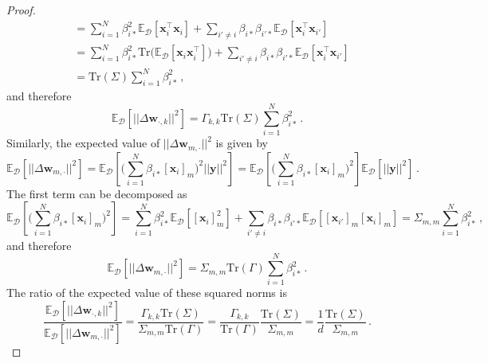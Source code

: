 \begin{proof}
\begin{equation}
\begin{split}
&=  \sum_{i=1}^N\beta^2_{i*}\mathbb{E}_{\mathcal{D}}\left[\bm{x}^\top_{i}\bm{x}_{i}\right] +
\sum_{i'\neq i}\beta_{i*}\beta_{i'*}\mathbb{E}_{\mathcal{D}}\left[\bm{x}^\top_{i}\bm{x}_{i'}\right]
\\
& =
 \sum_{i=1}^N\beta^2_{i*}\text{Tr}\big(\mathbb{E}_{\mathcal{D}}\left[\bm{x}_{i}\bm{x}_{i}^\top\right]\big) +
\sum_{i'\neq i}\beta_{i*}\beta_{i'*}\mathbb{E}_{\mathcal{D}}\left[\bm{x}^\top_{i}\bm{x}_{i'}\right] 
\\
& = \text{Tr}(\Sigma) \sum_{i=1}^N\beta^2_{i*} \,,
\end{split}
\end{equation}
%
and therefore
%
\begin{equation}
    \mathbb{E}_{\mathcal{D}}\left[ ||\Delta \bm{w}_{\cdot, k}||^2 \right] = \Gamma_{k,k}\text{Tr} (\Sigma) \sum_{i=1}^N\beta^2_{i*} \,.
\end{equation}
%
Similarly, the expected value of $||\Delta \bm{w}_{m, \cdot}||^2$ is given by
%
\begin{equation}
\mathbb{E}_{\mathcal{D}}\left[ ||\Delta \bm{w}_{m, \cdot}||^2 \right] 
= 
\mathbb{E}_{\mathcal{D}}\left[\big(\sum_{i=1}^N\beta_{i*}[\bm{x}_i]_m\big)^2 ||  \bm{y}||^2
\right]
= 
\mathbb{E}_{\mathcal{D}}\left[ \big(\sum_{i=1}^N\beta_{i*}[\bm{x}_i]_m\big)^2 \right] \mathbb{E}_{\mathcal{D}}\left[ ||  \bm{y}||^2\right]\,.
\end{equation}
%
The first term can be decomposed as
%
\begin{equation}
\mathbb{E}_{\mathcal{D}}\left[ \big(\sum_{i=1}^N\beta_{i*}[\bm{x}_i]_m\big)^2 \right]  =
\sum_{i=1}^N \beta^2_{i*}\mathbb{E}_{\mathcal{D}}\left[[\bm{x}_i]_m^2 \right]  + \sum_{i' \neq i}\beta_{i*}\beta_{i'*}\mathbb{E}_{\mathcal{D}}\left[ [\bm{x}_{i'}]_m [\bm{x}_{i}]_m \right] =  \Sigma_{m,m}\sum_{i=1}^N\beta^2_{i*} \,,
\end{equation}
%
and therefore
%
\begin{equation}
\mathbb{E}_{\mathcal{D}}\left[ ||\Delta \bm{w}_{m, \cdot}||^2 \right] = \Sigma_{m,m}\text{Tr}(\Gamma) \sum_{i=1}^N\beta^2_{i*}\,.
\end{equation}
%
The ratio of the expected value of these squared norms is
%
\begin{equation}
\frac{\mathbb{E}_{\mathcal{D}}\left[ ||\Delta \bm{w}_{\cdot, k}||^2 \right]}{\mathbb{E}_{\mathcal{D}}\left[ ||\Delta \bm{w}_{m, \cdot}||^2 \right]} = \frac{ \Gamma_{k,k}\text{Tr}(\Sigma)}{ \Sigma_{m,m}\text{Tr}(\Gamma)} = \frac{\Gamma_{k,k}}{\text{Tr}(\Gamma)}\frac{\text{Tr}(\Sigma)}{\Sigma_{m,m}} = \frac{1}{d}\frac{\text{Tr}(\Sigma)}{\Sigma_{m,m}} \,.

\end{equation}
\end{proof}
